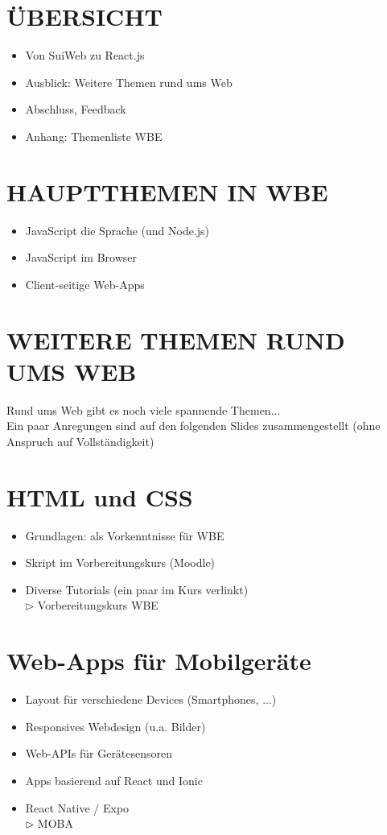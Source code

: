 \documentclass[10pt]{article}
\begin{document}
\section*{ÜBERSICHT}
\begin{itemize}
  \item Von SuiWeb zu React.js
  \item Ausblick: Weitere Themen rund ums Web
  \item Abschluss, Feedback
  \item Anhang: Themenliste WBE
\end{itemize}

\section*{HAUPTTHEMEN IN WBE}
\begin{itemize}
  \item JavaScript die Sprache (und Node.js)
  \item JavaScript im Browser
  \item Client-seitige Web-Apps
\end{itemize}

\section*{WEITERE THEMEN RUND UMS WEB}
Rund ums Web gibt es noch viele spannende Themen...\\
Ein paar Anregungen sind auf den folgenden Slides zusammengestellt (ohne Anspruch auf Vollständigkeit)

\section*{HTML und CSS}
\begin{itemize}
  \item Grundlagen: als Vorkenntnisse für WBE
  \item Skript im Vorbereitungskurs (Moodle)
  \item Diverse Tutorials (ein paar im Kurs verlinkt)\\
$\triangleright$ Vorbereitungskurs WBE
\end{itemize}

\section*{Web-Apps für Mobilgeräte}
\begin{itemize}
  \item Layout für verschiedene Devices (Smartphones, ...)
  \item Responsives Webdesign (u.a. Bilder)
  \item Web-APIs für Gerätesensoren
  \item Apps basierend auf React und Ionic
  \item React Native / Expo\\
$\triangleright$ MOBA
\end{itemize}
\end{document}
